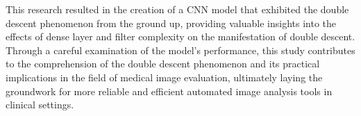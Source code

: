 This research resulted in the creation of a CNN model that exhibited the double descent phenomenon from the ground up, providing valuable insights into the effects of dense layer and filter complexity on the manifestation of double descent. Through a careful examination of the model's performance, this study contributes to the comprehension of the double descent phenomenon and its practical implications in the field of medical image evaluation, ultimately laying the groundwork for more reliable and efficient automated image analysis tools in clinical settings.
